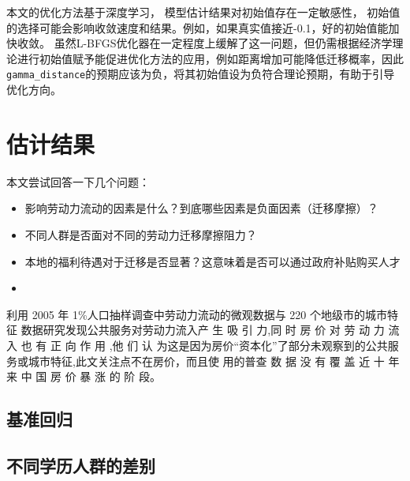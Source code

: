 \documentclass[a4paper,12pt,oneside]{book} %
\begin{document}
本文的优化方法基于深度学习，
模型估计结果对初始值存在一定敏感性，
初始值的选择可能会影响收敛速度和结果。例如，如果真实值接近-0.1，好的初始值能加快收敛。
虽然L-BFGS优化器在一定程度上缓解了这一问题，但仍需根据经济学理论进行初始值赋予能促进优化方法的应用，例如距离增加可能降低迁移概率，因此\lstinline{gamma_distance}的预期应该为负，将其初始值设为负符合理论预期，有助于引导优化方向。




\chapter{估计结果}

本文尝试回答一下几个问题：
\begin{itemize}
  \item 影响劳动力流动的因素是什么？到底哪些因素是负面因素（迁移摩擦）？
  \item 不同人群是否面对不同的劳动力迁移摩擦阻力？
  \item 本地的福利待遇对于迁移是否显著？这意味着是否可以通过政府补贴购买人才
  \item 
\end{itemize}


\cite{XiaYiRanChengShiJianDeMengMuSanQianGongGongFuWuYingXiangLaoDongLiLiuXiangDeJingYanYanJiu2015} 利用 2005 年 1\%人口抽样调查中劳动力流动的微观数据与 220 个地级市的城市特征 数据研究发现公共服务对劳动力流入产 生 吸 引 力,同 时 房 价 对 劳 动 力 流 入 也 有 正 向 作 用 ,他 们 认 为这是因为房价“资本化”了部分未观察到的公共服务或城市特征,此文关注点不在房价，而且使 用的普查 数 据 没 有 覆 盖 近 十 年 来 中 国 房 价 暴 涨 的 阶 段。

\section{基准回归} %
\label{sub:基准回归}



\section{不同学历人群的差别} %
\label{sub:不同学历人群的差别}




\end{document}
